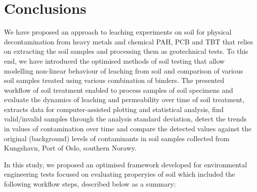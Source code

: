 \documentclass[algorithms,article,submit,pdftex,moreauthors]{Definitions/mdpi}
\begin{document}
\section{Conclusions}

We have proposed an approach to leaching experiments on soil for physical decontamination from heavy metals and chemical PAH, PCB and TBT that relies on extracting the soil samples and processing them as geotechnical tests. To this end, we have introduced the optimised methods of soil testing that allow modelling non-linear behaviour of leaching from soil and comparison of various soil samples treated using various combination of binders. The presented workflow of soil treatment enabled to process samples of soil specimens and evaluate the dynamics of leaching and permeability over time of soil treatment, extracts data for computer-assisted plotting and statistical analysis, find valid/invalid samples through the analysis standard deviation, detect the trends in values of contamination over time and compare the detected values against the original (background) levels of contaminants in soil samples collected from Kungshavn, Port of Oslo, southern Norawy. 

In this study, we proposed an optimised framework developed for environmental engineering tests focused on evaluating properyies of soil which included the following workflow steps, described below as a summary: 
\end{document}
